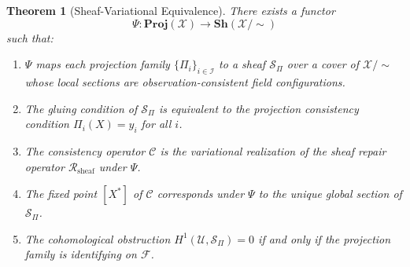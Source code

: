\documentclass[12pt, oneside]{article}
\newtheorem{theorem}{Theorem}[section]
\newcommand{\Xmod}{\mathcal{X}/{\sim}}
\begin{document}
\begin{theorem}[Sheaf-Variational Equivalence]
\label{thm:equivalence}
There exists a functor
\[
\Psi : \mathbf{Proj}(\mathcal{X}) \longrightarrow \mathbf{Sh}(\Xmod)
\]
such that:
\begin{enumerate}
\item[(i)] $\Psi$ maps each projection family $\{\Pi_i\}_{i \in \mathcal{I}}$ to a sheaf
$\mathcal{S}_\Pi$ over a cover of $\Xmod$ whose local sections are observation-consistent
field configurations.
\item[(ii)] The gluing condition of $\mathcal{S}_\Pi$ is equivalent to the projection
consistency condition $\Pi_i(X) = y_i$ for all $i$.
\item[(iii)] The consistency operator $\mathcal{C}$ is the variational realization of the
sheaf repair operator $\mathcal{R}_{\mathrm{sheaf}}$ under $\Psi$.
\item[(iv)] The fixed point $[X^*]$ of $\mathcal{C}$ corresponds under $\Psi$ to the
unique global section of $\mathcal{S}_\Pi$.
\item[(v)] The cohomological obstruction $H^1(\mathcal{U}, \mathcal{S}_\Pi) = 0$ if and
only if the projection family is identifying on $\mathcal{F}$.
\end{enumerate}
\end{theorem}
\end{document}
